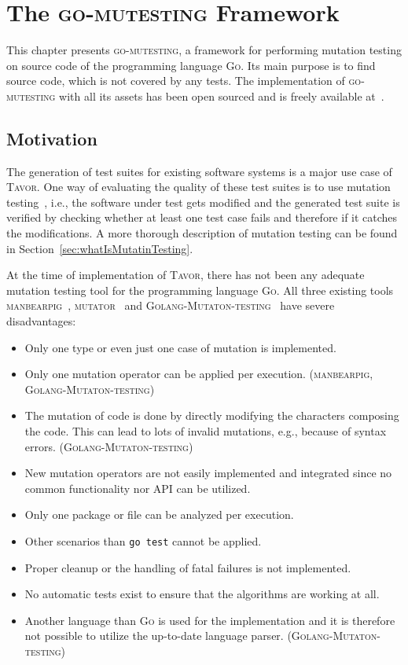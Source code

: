 \chapter{The \textsc{go-mutesting} Framework}
\label{chapter:goMutesting}

This chapter presents \textsc{go-mutesting}, a framework for performing mutation testing on source code of the programming language \textsc{Go}. Its main purpose is to find source code, which is not covered by any tests. The implementation of \textsc{go-mutesting} with all its assets has been open sourced and is freely available at~\cite{2017_go-mutesting_repository}.

\section{Motivation}
\label{sec:goMutestingMotivation}

The generation of test suites for existing software systems is a major use case of \textsc{Tavor}. One way of evaluating the quality of these test suites is to use mutation testing~\cite{jia2011analysis}, i.e., the software under test gets modified and the generated test suite is verified by checking whether at least one test case fails and therefore if it catches the modifications. A more thorough description of mutation testing can be found in Section~\ref{sec:whatIsMutatinTesting}.

At the time of implementation of \textsc{Tavor}, there has not been any adequate mutation testing tool for the programming language \textsc{Go}. All three existing tools \textsc{manbearpig}~\cite{2017_manbearpig_repository}, \textsc{mutator}~\cite{2017_mutator_repository} and \textsc{Golang-Mutaton-testing}~\cite{2017_Golang-Mutaton-testing_repository} have severe disadvantages:

\begin{itemize}
\item Only one type or even just one case of mutation is implemented.
\item Only one mutation operator can be applied per execution. (\textsc{manbearpig}, \textsc{Golang-Mutaton-testing})
\item The mutation of code is done by directly modifying the characters composing the code. This can lead to lots of invalid mutations, e.g., because of syntax errors. (\textsc{Golang-Mutaton-testing})
\item New mutation operators are not easily implemented and integrated since no common functionality nor API can be utilized.
\item Only one package or file can be analyzed per execution.
\item Other scenarios than \texttt{go test} cannot be applied.
\item Proper cleanup or the handling of fatal failures is not implemented.
\item No automatic tests exist to ensure that the algorithms are working at all.
\item Another language than \textsc{Go} is used for the implementation and it is therefore not possible to utilize the up-to-date language parser. (\textsc{Golang-Mutaton-testing})
\end{itemize}

